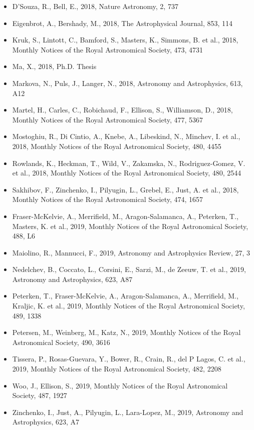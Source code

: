 \documentclass{letter}
\begin{document}
\begin{enumerate}
\begin{itemize}
\item D'Souza, R., Bell, E., 2018, Nature Astronomy, 2, 737
\item Eigenbrot, A., Bershady, M., 2018, The Astrophysical Journal, 853, 114
\item Kruk, S., Lintott, C., Bamford, S., Masters, K., Simmons, B. et al., 2018, Monthly Notices of the Royal Astronomical Society, 473, 4731
\item Ma, X., 2018, Ph.D. Thesis
\item Markova, N., Puls, J., Langer, N., 2018, Astronomy and Astrophysics, 613, A12
\item Martel, H., Carles, C., Robichaud, F., Ellison, S., Williamson, D., 2018, Monthly Notices of the Royal Astronomical Society, 477, 5367
\item Mostoghiu, R., Di Cintio, A., Knebe, A., Libeskind, N., Minchev, I. et al., 2018, Monthly Notices of the Royal Astronomical Society, 480, 4455
\item Rowlands, K., Heckman, T., Wild, V., Zakamska, N., Rodriguez-Gomez, V. et al., 2018, Monthly Notices of the Royal Astronomical Society, 480, 2544
\item Sakhibov, F., Zinchenko, I., Pilyugin, L., Grebel, E., Just, A. et al., 2018, Monthly Notices of the Royal Astronomical Society, 474, 1657
\item Fraser-McKelvie, A., Merrifield, M., Aragon-Salamanca, A., Peterken, T., Masters, K. et al., 2019, Monthly Notices of the Royal Astronomical Society, 488, L6
\item Maiolino, R., Mannucci, F., 2019, Astronomy and Astrophysics Review, 27, 3
\item Nedelchev, B., Coccato, L., Corsini, E., Sarzi, M., de Zeeuw, T. et al., 2019, Astronomy and Astrophysics, 623, A87
\item Peterken, T., Fraser-McKelvie, A., Aragon-Salamanca, A., Merrifield, M., Kraljic, K. et al., 2019, Monthly Notices of the Royal Astronomical Society, 489, 1338
\item Petersen, M., Weinberg, M., Katz, N., 2019, Monthly Notices of the Royal Astronomical Society, 490, 3616
\item Tissera, P., Rosas-Guevara, Y., Bower, R., Crain, R., del P Lagos, C. et al., 2019, Monthly Notices of the Royal Astronomical Society, 482, 2208
\item Woo, J., Ellison, S., 2019, Monthly Notices of the Royal Astronomical Society, 487, 1927
\item Zinchenko, I., Just, A., Pilyugin, L., Lara-Lopez, M., 2019, Astronomy and Astrophysics, 623, A7

\end{itemize}
\end{enumerate}
\end{document}
